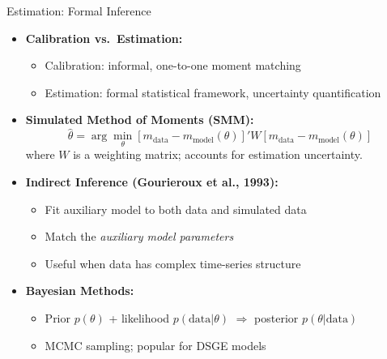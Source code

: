 \begin{frame}{Estimation: Formal Inference}
\begin{itemize}
\item \textbf{Calibration vs.\ Estimation:}
\begin{itemize}
    \item Calibration: informal, one-to-one moment matching
    \item Estimation: formal statistical framework, uncertainty quantification
\end{itemize}

\medskip
\item \textbf{Simulated Method of Moments (SMM):}
\[
\hat{\theta} = \arg\min_\theta \left[ m_{\text{data}} - m_{\text{model}}(\theta) \right]' W \left[ m_{\text{data}} - m_{\text{model}}(\theta) \right]
\]
where $W$ is a weighting matrix; accounts for estimation uncertainty.

\medskip
\item \textbf{Indirect Inference (Gourieroux et al., 1993):}
\begin{itemize}
    \item Fit auxiliary model to both data and simulated data
    \item Match the \emph{auxiliary model parameters}
    \item Useful when data has complex time-series structure
\end{itemize}

\medskip
\item \textbf{Bayesian Methods:}
\begin{itemize}
    \item Prior $p(\theta)$ + likelihood $p(\text{data}|\theta)$ $\Rightarrow$ posterior $p(\theta|\text{data})$
    \item MCMC sampling; popular for DSGE models
\end{itemize}
\end{itemize}
\end{frame}

